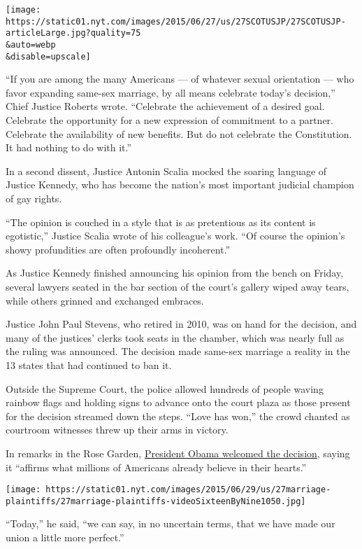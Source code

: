 \texttt{[image: https://static01.nyt.com/images/2015/06/27/us/27SCOTUSJP/27SCOTUSJP-articleLarge.jpg?quality=75\\\&auto=webp\\\&disable=upscale]}

``If you are among the many Americans --- of whatever sexual orientation
--- who favor expanding same-sex marriage, by all means celebrate
today's decision,'' Chief Justice Roberts wrote. ``Celebrate the
achievement of a desired goal. Celebrate the opportunity for a new
expression of commitment to a partner. Celebrate the availability of new
benefits. But do not celebrate the Constitution. It had nothing to do
with it.''

In a second dissent, Justice Antonin Scalia mocked the soaring language
of Justice Kennedy, who has become the nation's most important judicial
champion of gay rights.

``The opinion is couched in a style that is as pretentious as its
content is egotistic,'' Justice Scalia wrote of his colleague's work.
``Of course the opinion's showy profundities are often profoundly
incoherent.''

As Justice Kennedy finished announcing his opinion from the bench on
Friday, several lawyers seated in the bar section of the court's gallery
wiped away tears, while others grinned and exchanged embraces.

Justice John Paul Stevens, who retired in 2010, was on hand for the
decision, and many of the justices' clerks took seats in the chamber,
which was nearly full as the ruling was announced. The decision made
same-sex marriage a reality in the 13 states that had continued to ban
it.

Outside the Supreme Court, the police allowed hundreds of people waving
rainbow flags and holding signs to advance onto the court plaza as those
present for the decision streamed down the steps. ``Love has won,'' the
crowd chanted as courtroom witnesses threw up their arms in victory.

In remarks in the Rose Garden,
\href{http://www.nytimes.com/video/us/politics/100000003766147/obama-on-same-sex-marriage-ruling.html?hp\&action=click\&pgtype=Homepage\&module=a-lede-package-region\&region=top-news\&WT.nav=top-news}{President
Obama welcomed the decision}, saying it ``affirms what millions of
Americans already believe in their hearts.''

\texttt{[image: https://static01.nyt.com/images/2015/06/29/us/27marriage-plaintiffs/27marriage-plaintiffs-videoSixteenByNine1050.jpg]}

``Today,'' he said, ``we can say, in no uncertain terms, that we have
made our union a little more perfect.''

